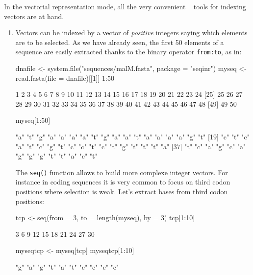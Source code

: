 \documentclass{article}
\begin{document}
In the vectorial representation mode, all the very convenient \Rlogo{}~ tools for indexing vectors
are at hand.
\begin{enumerate}
\item Vectors can be indexed by a vector of \emph{positive} integers saying which
elements are to be selected. As we have already seen, the first 50 elements of a sequence
are easily extracted thanks to the binary operator \texttt{from:to}, as in:

\begin{Schunk}
\begin{Sinput}
 dnafile <- system.file("sequences/malM.fasta", package = "seqinr")
 myseq <- read.fasta(file = dnafile)[[1]]
 1:50
\end{Sinput}
\begin{Soutput}
 [1]  1  2  3  4  5  6  7  8  9 10 11 12 13 14 15 16 17 18 19 20 21 22 23 24
[25] 25 26 27 28 29 30 31 32 33 34 35 36 37 38 39 40 41 42 43 44 45 46 47 48
[49] 49 50
\end{Soutput}
\begin{Sinput}
 myseq[1:50]
\end{Sinput}
\begin{Soutput}
 [1] "a" "t" "g" "a" "a" "a" "a" "t" "g" "a" "a" "t" "a" "a" "a" "a" "g" "t"
[19] "c" "t" "c" "a" "t" "c" "g" "t" "c" "c" "t" "c" "t" "g" "t" "t" "t" "a"
[37] "t" "c" "a" "g" "c" "a" "g" "g" "g" "t" "t" "a" "c" "t"
\end{Soutput}
\end{Schunk}

The \texttt{seq()} function allows to build more complexe integer vectors. For instance
in coding sequences it is very common to focus on third codon positions where
selection is weak. Let's extract bases from third codon positions:

\begin{Schunk}
\begin{Sinput}
 tcp <- seq(from = 3, to = length(myseq), by = 3)
 tcp[1:10]
\end{Sinput}
\begin{Soutput}
 [1]  3  6  9 12 15 18 21 24 27 30
\end{Soutput}
\begin{Sinput}
 myseqtcp <- myseq[tcp]
 myseqtcp[1:10]
\end{Sinput}
\begin{Soutput}
 [1] "g" "a" "g" "t" "a" "t" "c" "c" "c" "c"
\end{Soutput}
\end{Schunk}
 

\end{enumerate}
\end{document}
